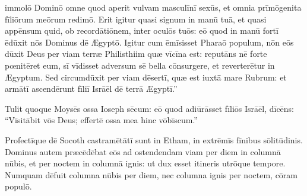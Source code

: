 immolō Dominō omne quod aperit vulvam
masculīnī sexūs, et omnia prīmōgenita fīliōrum meōrum
redimō. Erit igitur quasi signum in manū tuā, et quasi
appēnsum quid, ob
recordātiōnem, inter
oculōs tuōs: eō quod in manū fortī ēdūxit nōs Dominus dē Ægyptō. Igitur
cum ēmīsisset Pharaō populum, nōn eōs dūxit Deus per viam terræ Philisthiim
quæ vīcīna est: reputāns nē forte
pœnitēret eum, sī vīdisset adversum sē bella
cōnsurgere, et reverterētur in Ægyptum. Sed
circumdūxit per viam dēsertī, quæ est iuxtā mare Rubrum:
et armātī ascendērunt fīliī Isrāēl dē terrā Ægyptī.''

Tulit quoque Moysēs
ossa Ioseph sēcum: eō quod adiūrāsset fīliōs Isrāēl,
dīcēns: ``Vīsitābit vōs Deus;
effertē ossa mea hinc vōbīscum.''

Profectīque dē Socoth castramētātī sunt in Etham, in
extrēmīs fīnibus sōlitūdinis. Dominus autem præcēdēbat
eōs ad ostendendam viam per diem in columnā nūbis, et per noctem in columnā
ignis: ut dux esset itineris utrōque tempore. Numquam dēfuit columna
nūbis per diem, nec columna ignis per noctem, cōram populō. 
